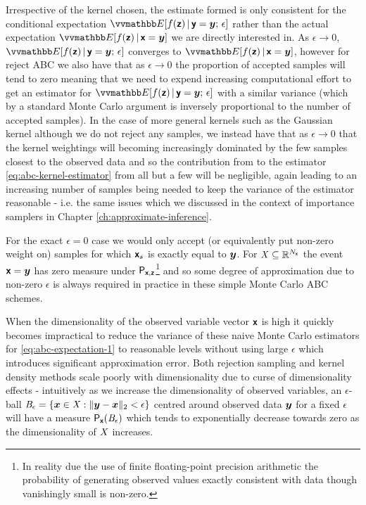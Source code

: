 Irrespective of the kernel chosen, the estimate formed is only consistent for the conditional expectation $\expc{f(\rvct{z}) \gvn \rvct{y} = \vct{y};\,\epsilon}$ rather than the actual expectation $\expc{f(\rvct{z}) \gvn \rvct{x} = \vct{y}}$ we are directly interested in. As $\epsilon \to 0$, $\expc{f(\rvct{z}) \gvn \rvct{y} = \vct{y};\,\epsilon}$ converges to $\expc{f(\rvct{z}) \gvn \rvct{x} = \vct{y}}$, however for reject \ac{ABC} we also have that as $\epsilon \to 0$ the proportion of accepted samples will tend to zero meaning that we need to expend increasing computational effort to get an estimator for $\expc{f(\rvct{z}) \gvn \rvct{y} = \vct{y};\,\epsilon}$ with a similar variance (which by a standard Monte Carlo argument is inversely proportional to the number of accepted samples). In the case of more general kernels such as the Gaussian kernel although we do not reject any samples, we instead have that as $\epsilon \to 0$ that the kernel weightings will becoming increasingly dominated by the few samples closest to the observed data and so the contribution from to the estimator \eqref{eq:abc-kernel-estimator} from all but a few will be negligible, again leading to an increasing number of samples being needed to keep the variance of the estimator reasonable - i.e. the same issues which we discussed in the context of importance samplers in Chapter \ref{ch:approximate-inference}. 

For the exact $\epsilon = 0$ case we would only accept (or equivalently put non-zero weight on) samples for which $\boldsymbol{\mathsf{x}}_s$ is exactly equal to $\boldsymbol{y}$. For $\mathit{X} \subseteq \mathbb{R}^{N_{\boldsymbol{\mathsf{x}}}}$ the event $\boldsymbol{\mathsf{x}} = \boldsymbol{y}$ has zero measure under $\mathsf{P}_{\boldsymbol{\mathsf{x}},\boldsymbol{\mathsf{z}}}$\footnote{In reality due the use of finite floating-point precision arithmetic the probability of generating observed values exactly consistent with data though vanishingly small is non-zero.} and so some degree of approximation due to non-zero $\epsilon$ is always required in practice in these simple Monte Carlo \ac{ABC} schemes.

When the dimensionality of the observed variable vector $\boldsymbol{\mathsf{x}}$ is high it quickly becomes impractical to reduce the variance of these naive Monte Carlo estimators for \eqref{eq:abc-expectation-1} to reasonable levels without using large $\epsilon$ which introduces significant approximation error. Both rejection sampling and kernel density methods scale poorly with dimensionality due to curse of dimensionality effects \citep{blum2010approximate,marin2012approximate,prangle2015summary} - intuitively as we increase the dimensionality of observed variables, an $\epsilon$-ball $\set{B}_\epsilon = \fset{\vct{x} \in \set{X} : \Vert \vct{y} - \vct{x} \Vert_2 < \epsilon}$ centred around observed data $\boldsymbol{y}$ for a fixed $\epsilon$ will have a measure $\mathsf{P}_{\boldsymbol{\mathsf{x}}}(\mathit{B}_\epsilon)$ which tends to exponentially decrease towards zero as the dimensionality of $\mathit{X}$ increases.

